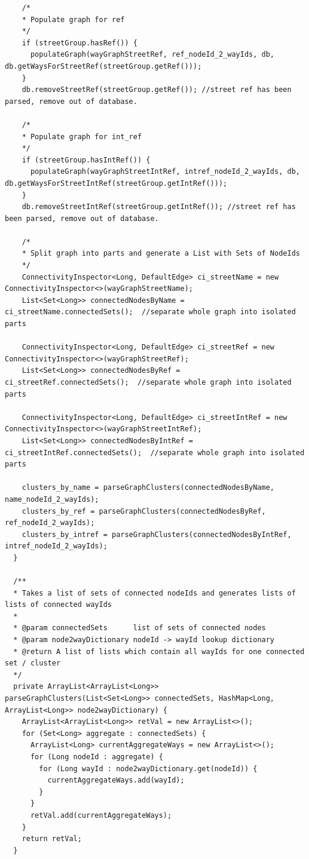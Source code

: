 \begin{lstlisting}
    /*
    * Populate graph for ref
    */
    if (streetGroup.hasRef()) {
      populateGraph(wayGraphStreetRef, ref_nodeId_2_wayIds, db, db.getWaysForStreetRef(streetGroup.getRef()));
    }
    db.removeStreetRef(streetGroup.getRef()); //street ref has been parsed, remove out of database.
    
    /*
    * Populate graph for int_ref
    */
    if (streetGroup.hasIntRef()) {
      populateGraph(wayGraphStreetIntRef, intref_nodeId_2_wayIds, db, db.getWaysForStreetIntRef(streetGroup.getIntRef()));
    }
    db.removeStreetIntRef(streetGroup.getIntRef()); //street ref has been parsed, remove out of database.
    
    /*
    * Split graph into parts and generate a List with Sets of NodeIds
    */
    ConnectivityInspector<Long, DefaultEdge> ci_streetName = new ConnectivityInspector<>(wayGraphStreetName);
    List<Set<Long>> connectedNodesByName = ci_streetName.connectedSets();  //separate whole graph into isolated parts
    
    ConnectivityInspector<Long, DefaultEdge> ci_streetRef = new ConnectivityInspector<>(wayGraphStreetRef);
    List<Set<Long>> connectedNodesByRef = ci_streetRef.connectedSets();  //separate whole graph into isolated parts
    
    ConnectivityInspector<Long, DefaultEdge> ci_streetIntRef = new ConnectivityInspector<>(wayGraphStreetIntRef);
    List<Set<Long>> connectedNodesByIntRef = ci_streetIntRef.connectedSets();  //separate whole graph into isolated parts
    
    clusters_by_name = parseGraphClusters(connectedNodesByName, name_nodeId_2_wayIds);
    clusters_by_ref = parseGraphClusters(connectedNodesByRef, ref_nodeId_2_wayIds);
    clusters_by_intref = parseGraphClusters(connectedNodesByIntRef, intref_nodeId_2_wayIds);
  }
  
  /**
  * Takes a list of sets of connected nodeIds and generates lists of lists of connected wayIds
  *
  * @param connectedSets      list of sets of connected nodes
  * @param node2wayDictionary nodeId -> wayId lookup dictionary
  * @return A list of lists which contain all wayIds for one connected set / cluster
  */
  private ArrayList<ArrayList<Long>> parseGraphClusters(List<Set<Long>> connectedSets, HashMap<Long, ArrayList<Long>> node2wayDictionary) {
    ArrayList<ArrayList<Long>> retVal = new ArrayList<>();
    for (Set<Long> aggregate : connectedSets) {
      ArrayList<Long> currentAggregateWays = new ArrayList<>();
      for (Long nodeId : aggregate) {
        for (Long wayId : node2wayDictionary.get(nodeId)) {
          currentAggregateWays.add(wayId);
        }
      }
      retVal.add(currentAggregateWays);
    }
    return retVal;
  }
  

\end{lstlisting}
